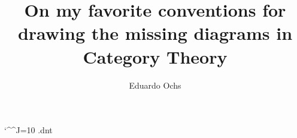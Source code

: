\documentclass[oneside,12pt]{article}
\begin{document}

\ifluatex
  \catcode`\^^J=10
\else
  \jobname.dnt
  \def\pu{}
\fi




\def\co#1{{%
  \def\%{\char37}%
  \def\\{\char92}%
  \def\^{\char94}%
  \def\~{\char126}%
  \tt#1%
  }}
\def\qco#1{`\co{#1}'}
\def\qqco#1{``\co{#1}''}

\def\respcomp{\mathsf{respcomp}}
\def\respids {\mathsf{respids}}
\def\sqcond  {\mathsf{sqcond}}
\def\assoc   {\mathsf{assoc}}
\def\idL     {\mathsf{idL}}
\def\idR     {\mathsf{idR}}
\def\univ    {\mathsf{univ}}
\def\Ran     {\mathsf{Ran}}

\def\sfC  {\mathsf{C}}
\def\sfSet{\mathsf{Set}}
\def\Ring {\mathbf{Ring}}
\def\nameof#1{\ulcorner#1\urcorner}
\def\catK {\mathbf{K}}

\def\veq{\rotatebox{90}{$=$}}
\def\liml{\underleftarrow {\lim}{}}
\def\limr{\underrightarrow{\lim}{}}

\def\DONE{(DONE)}
\def\DONE{}

%

\long{}
\long{}
\long{}
\long{}
\long{}
\long{}
\long{}
\long{}
\long{}
\long{}



%                     

\title{On my favorite conventions for drawing the missing diagrams in
  Category Theory}

\author{Eduardo Ochs}


\maketitle
\end{document}
